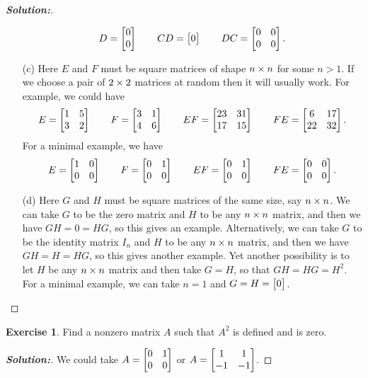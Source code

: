 \documentclass[a4paper]{amsart}
\theoremstyle{definition}
\newtheorem{exercise}{Exercise}
\newenvironment{solution}{\begin{proof}[\textbf{Solution:}] \vphantom{u}}{\end{proof}}
\begin{document}
\begin{solution}
\begin{itemize}
\[      D = \left[\begin{matrix} 0 \\ 0 \end{matrix}\right] \qquad
      CD = \left[\begin{matrix} 0 \end{matrix}\right] \qquad
      DC = \left[\begin{matrix} 0 & 0 \\ 0 & 0 \end{matrix}\right].
   \]
  \item[(c)] Here $E$ and $F$ must be square matrices of shape
   $n\times n$ for some $n>1$.  If we choose a pair of $2\times 2$ matrices
   at random then it will usually work.  For example, we could have 
   \[ E = \left[\begin{matrix} 1&5\\3&2 \end{matrix}\right] \qquad
      F = \left[\begin{matrix} 3&1\\4&6 \end{matrix}\right] \qquad
      EF = \left[\begin{matrix} 23 & 31 \\ 17 & 15 \end{matrix}\right] \qquad
      FE = \left[\begin{matrix} 6 & 17 \\ 22 & 32 \end{matrix}\right].
   \]
   For a minimal example, we have
   \[ E  = \left[\begin{matrix} 1&0\\0&0 \end{matrix}\right] \qquad
      F  = \left[\begin{matrix} 0&1\\0&0 \end{matrix}\right] \qquad
      EF = \left[\begin{matrix} 0&1\\0&0 \end{matrix}\right] \qquad
      FE = \left[\begin{matrix} 0&0\\0&0 \end{matrix}\right].
   \]
  \item[(d)] Here $G$ and $H$ must be square matrices of the same
   size, say $n\times n$.  We can take $G$ to be the zero matrix and $H$
   to be any $n\times n$ matrix, and then we have $GH=0=HG$, so this
   gives an example.  Alternatively, we can take $G$ to be the
   identity matrix $I_n$ and $H$ to be any $n\times n$ matrix, and then
   we have $GH=H=HG$, so this gives another example.  Yet another
   possibility is to let $H$ be any $n\times n$ matrix and then take
   $G=H$, so that $GH=HG=H^2$.  For a minimal example, we can take
   $n=1$ and $G=H=\left[\begin{matrix} 0 \end{matrix}\right]$.
 \end{itemize}
\end{solution}

\begin{exercise}\label{ex-mat-prod-eg-ii}
 Find a nonzero matrix $A$ such that $A^2$ is defined and is zero.
\end{exercise}
\begin{solution}
 We could take $A=\left[\begin{matrix} 0&1\\0&0\end{matrix}\right]$ or $A=\left[\begin{matrix} 1&1\\-1&-1\end{matrix}\right]$.
\end{solution}
\end{document}
